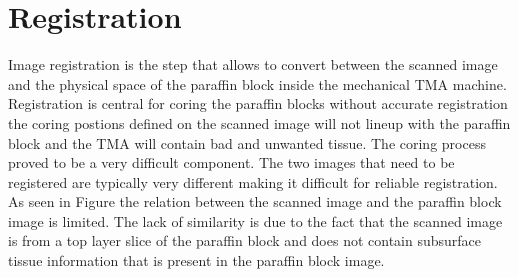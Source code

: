 \documentclass[a4paper,10pt,oneside]{article}
\begin{document}
\section{Registration}
Image registration is the step that allows to convert between the scanned image and the physical space of the paraffin block inside the mechanical TMA machine. Registration is central for coring the paraffin blocks without accurate registration the coring postions defined on the scanned image will not lineup with the paraffin block and the TMA will contain bad and unwanted tissue. The coring process proved to be a very difficult component. The two images that need to be registered are typically very different making it difficult for reliable registration. As seen in Figure the relation between the scanned image and the paraffin block image is limited. The lack of similarity is due to the fact that the scanned image is from a top layer slice of the paraffin block and does not contain subsurface tissue information that is present in the paraffin block image.
\end{document}
